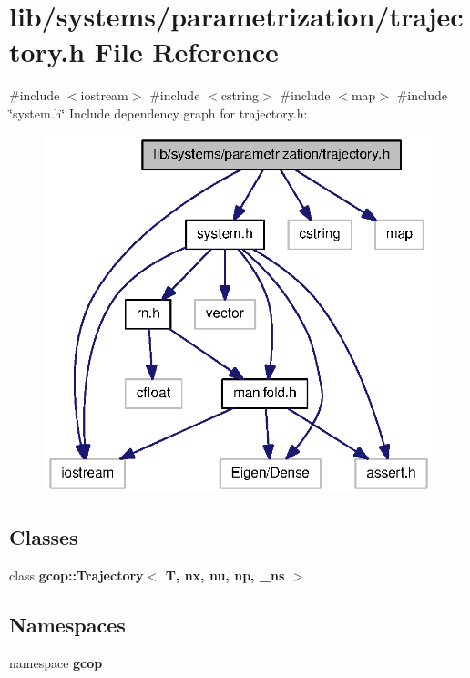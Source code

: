\section{lib/systems/parametrization/trajectory.h \-File \-Reference}
\label{trajectory_8h}
{\ttfamily \#include $<$iostream$>$}\*
{\ttfamily \#include $<$cstring$>$}\*
{\ttfamily \#include $<$map$>$}\*
{\ttfamily \#include \char`\"{}system.\-h\char`\"{}}\*
\-Include dependency graph for trajectory.\-h\-:\nopagebreak
\begin{figure}[H]
\begin{center}
\leavevmode
\includegraphics[width=318pt]{trajectory_8h__incl}
\end{center}
\end{figure}
\subsection*{\-Classes}
\begin{DoxyCompactItemize}
\item 
class {\bf gcop\-::\-Trajectory$<$ T, nx, nu, np, \-\_\-ns $>$}
\end{DoxyCompactItemize}
\subsection*{\-Namespaces}
\begin{DoxyCompactItemize}
\item 
namespace {\bf gcop}
\end{DoxyCompactItemize}
